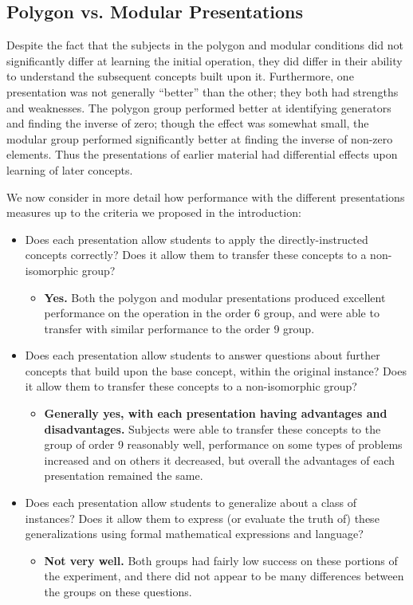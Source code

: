 \documentclass[man,10pt]{apa6}
\begin{document}
\subsection{Polygon vs. Modular Presentations}
Despite the fact that the subjects in the polygon and modular conditions did not significantly differ at learning the initial operation, they did differ in their ability to understand the subsequent concepts built upon it. Furthermore, one presentation was not generally ``better'' than the other; they both had strengths and weaknesses. The polygon group performed better at identifying generators and finding the inverse of zero; though the effect was somewhat small, the modular group performed significantly better at finding the inverse of non-zero elements. Thus the presentations of earlier material had differential effects upon learning of later concepts. \par 
We now consider in more detail how performance with the different presentations measures up to the criteria we proposed in the introduction:
\begin{itemize}
\item Does each presentation allow students to apply the directly-instructed concepts correctly? Does it allow them to transfer these concepts to a non-isomorphic group?
\begin{itemize}
\item[] \textbf{Yes.} Both the polygon and modular presentations produced excellent performance on the operation in the order 6 group, and were able to transfer with similar performance to the order 9 group.
\end{itemize}
\item Does each presentation allow students to answer questions about further concepts that build upon the base concept, within the original instance? Does it allow them to transfer these concepts to a non-isomorphic group?
\begin{itemize}
\item[] \textbf{Generally yes, with each presentation having advantages and disadvantages.} Subjects were able to transfer these concepts to the group of order 9 reasonably well, performance on some types of problems increased and on others it decreased, but overall the advantages of each presentation remained the same. 
\end{itemize}
\item Does each presentation allow students to generalize about a class of instances? Does it allow them to express (or evaluate the truth of) these generalizations using formal mathematical expressions and language? 
\begin{itemize}
\item[] \textbf{Not very well.} Both groups had fairly low success on these portions of the experiment, and there did not appear to be many differences between the groups on these questions.
\end{itemize}
\end{itemize}
\end{document}
